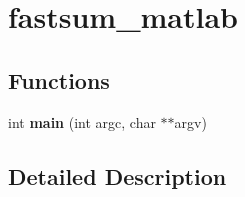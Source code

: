 \hypertarget{group__applications__fastsum__matlab}{\section{fastsum\-\_\-matlab}
\label{group__applications__fastsum__matlab}
}
\subsection*{Functions}
\begin{DoxyCompactItemize}
\item 
\hypertarget{group__applications__fastsum__matlab_ga3c04138a5bfe5d72780bb7e82a18e627}{int {\bfseries main} (int argc, char $\ast$$\ast$argv)}\label{group__applications__fastsum__matlab_ga3c04138a5bfe5d72780bb7e82a18e627}

\end{DoxyCompactItemize}


\subsection{Detailed Description}
